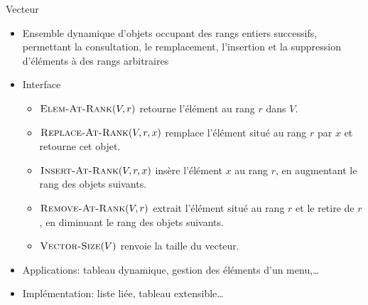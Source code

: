 \begin{frame}{Vecteur}

\begin{itemize}
\item Ensemble dynamique d'objets occupant des rangs entiers
  successifs, permettant la consultation, le remplacement, l'insertion
  et la suppression d'éléments à des rangs arbitraires
\item Interface
\begin{itemize}
\item $\textnormal{\scshape Elem-At-Rank}(V,r)$ retourne l'élément au rang $r$ dans $V$.
\item $\textnormal{\scshape Replace-At-Rank}(V,r,x)$ remplace l'élément situé au rang $r$ par $x$ et retourne cet objet. 
\item $\textnormal{\scshape Insert-At-Rank}(V,r,x)$ insère l'élément $x$ au rang $r$, en augmentant le rang des objets suivants.
\item $\textnormal{\scshape Remove-At-Rank}(V,r)$ extrait l'élément situé au rang $r$ et le retire de $r$, en diminuant le rang des objets suivants.
\item $\textnormal{\scshape Vector-Size}(V)$ renvoie la taille du vecteur.
\end{itemize}
\item Applications: tableau dynamique, gestion des éléments d'un menu,\ldots
\item Implémentation: liste liée, tableau extensible\ldots
\end{itemize}

\end{frame}

